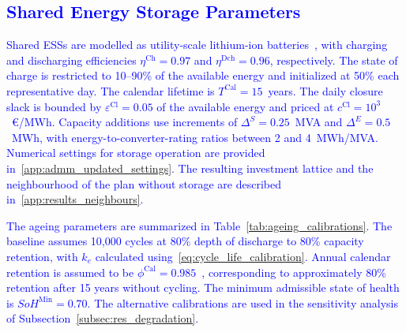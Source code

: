 \documentclass[preprint,12pt]{elsarticle}
\begin{document}
\subsection{\textcolor{blue}{Shared Energy Storage Parameters}}
\label{sec:case_ess_params}

\textcolor{blue}{
    Shared ESSs are modelled as utility-scale lithium-ion batteries~\cite{nrel_ess_costs}, with charging and discharging efficiencies $\eta^{\text{Ch}} = 0.97$ and $\eta^{\text{Dch}} = 0.96$, respectively.
    The state of charge is restricted to 10--90\% of the available energy and initialized at 50\% each representative day. The calendar lifetime is $T^{\text{Cal}} = 15$~years.
    The daily closure slack is bounded by $\varepsilon^{\text{Cl}} = 0.05$ of the available energy and priced at $c^{\text{Cl}} = 10^{3}$~\euro/MWh.
    Capacity additions use increments of $\Delta^S = 0.25$~MVA and $\Delta^E = 0.5$~MWh, with energy-to-converter-rating ratios between 2 and 4~MWh/MVA. Numerical settings for storage operation are provided in~\ref{app:admm_updated_settings}.
}
\textcolor{blue}{
    The resulting investment lattice and the neighbourhood of the plan without storage are described in~\ref{app:results_neighbours}.
}

\textcolor{blue}{
    The ageing parameters are summarized in Table~\ref{tab:ageing_calibrations}.
    The baseline assumes 10{,}000 cycles at 80\% depth of discharge to 80\% capacity retention, with $k_e$ calculated using~\eqref{eq:cycle_life_calibration}. 
    Annual calendar retention is assumed to be $\phi^{\text{Cal}} = 0.985$~\cite{naumann_2018}, corresponding to approximately 80\% retention after 15 years without cycling. The minimum admissible state of health is $SoH^{\text{Min}} = 0.70$.
    The alternative calibrations are used in the sensitivity analysis of Subsection~\ref{subsec:res_degradation}.
}
\end{document}
